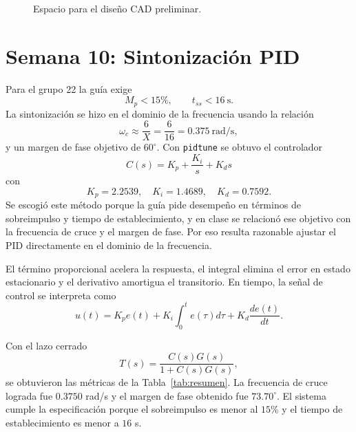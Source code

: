 \documentclass[conference]{IEEEtran}
\begin{document}
\begin{figure}[!t]
\centering
{}
\caption{Espacio para el dise\~no CAD preliminar.}
\label{fig:cad}
\end{figure}

\section{Semana 10: Sintonizaci\'on PID}
Para el grupo 22 la gu\'ia exige
\begin{equation}
M_p<15\%, \qquad t_{ss}<16~\text{s}.
\label{eq:specs}
\end{equation}
La sintonizaci\'on se hizo en el dominio de la frecuencia usando la relaci\'on
\begin{equation}
\omega_c \approx \frac{6}{X}=\frac{6}{16}=0.375~\text{rad/s},
\end{equation}
y un margen de fase objetivo de $60^\circ$. Con \texttt{pidtune} se obtuvo el controlador
\begin{equation}
C(s)=K_p+\frac{K_i}{s}+K_ds
\end{equation}
con
\begin{equation}
K_p=2.2539,\quad K_i=1.4689,\quad K_d=0.7592.
\label{eq:gains}
\end{equation}
Se escogi\'o este m\'etodo porque la gu\'ia pide desempe\~no en t\'erminos de sobreimpulso y tiempo de establecimiento, y en clase se relacion\'o ese objetivo con la frecuencia de cruce y el margen de fase. Por eso resulta razonable ajustar el PID directamente en el dominio de la frecuencia.

El t\'ermino proporcional acelera la respuesta, el integral elimina el error en estado estacionario y el derivativo amortigua el transitorio. En tiempo, la se\~nal de control se interpreta como
\begin{equation}
u(t)=K_pe(t)+K_i\int_0^te(\tau)d\tau+K_d\frac{de(t)}{dt}.
\label{eq:u}
\end{equation}

Con el lazo cerrado
\begin{equation}
T(s)=\frac{C(s)G(s)}{1+C(s)G(s)},
\end{equation}
se obtuvieron las m\'etricas de la Tabla~\ref{tab:resumen}. La frecuencia de cruce lograda fue $0.3750$ rad/s y el margen de fase obtenido fue $73.70^\circ$. El sistema cumple la especificaci\'on porque el sobreimpulso es menor al $15\%$ y el tiempo de establecimiento es menor a $16$ s.
\end{document}
